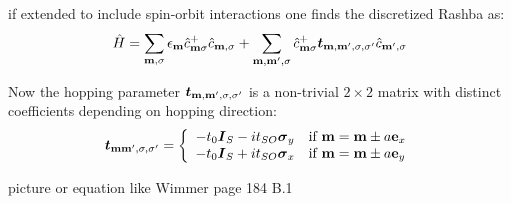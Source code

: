 if extended to include spin-orbit interactions one finds the discretized Rashba \hamil{} as:
\begin{align}
	\hat{H} = \sum_{\mathbf{m},\sigma} \epsilon_{\mathbf{m}} \hat{c}^+_{\mathbf{m}\sigma} \hat{c}_{\mathbf{m},\sigma} +
	\sum_{\mathbf{m},\mathbf{m'},\sigma}  \hat{c}^+_{\mathbf{m}\sigma} \boldsymbol{t}_{\mathbf{m},\mathbf{m'},\sigma,\sigma '} \hat{c}_{\mathbf{m'},\sigma}
	\label{eqn:discretizedrashbahamil}
\end{align}

Now the hopping parameter $\boldsymbol{t}_{\mathbf{m},\mathbf{m'},\sigma,\sigma '}$ is a non-trivial $2 \times 2$ matrix with distinct coefficients depending on hopping direction:
\begin{align}
	\boldsymbol{t}_{\mathbf{m}\mathbf{m'},\sigma,\sigma '} = \left\{ \begin{array}[c]{cl} -t_0\boldsymbol{I}_S - i t_{SO} \boldsymbol{\sigma}_y & \text{if } \mathbf{m} = \mathbf{m} \pm a \mathbf{e}_{x} \\
		-t_0\boldsymbol{I}_S + i t_{SO} \boldsymbol{\sigma}_x & \text{if } \mathbf{m} = \mathbf{m} \pm a \mathbf{e}_{y} \end{array} \right.
	\label{eqn:tsohopping}
\end{align}

picture or equation like Wimmer page 184 B.1
